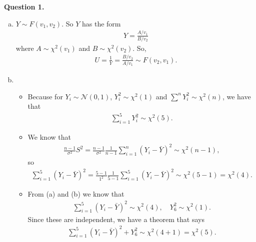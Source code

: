 \documentclass[11pt]{article}
\begin{document}
\noindent \textbf{Question 1.}
\begin{enumerate}[(a)]
	\item $Y \sim F(v_1,v_2)$. So $Y$ has the form
	\begin{align*}
	Y = \frac{A/v_1}{B/v_2}
	\end{align*}
	where $A \sim \chi^2(v_1)$ and $B \sim \chi^2(v_2)$. So, 
	\begin{align*}
	U = \frac{1}{Y} = \frac{B/v_2}{A/v_1} \sim F(v_2,v_1).
	\end{align*}
	
	
	\item 
	\begin{itemize}
		\item Because for $Y_i \sim \mathcal{N}(0,1)$, $Y_i^2\sim \chi^2(1)$ and $\sum^n Y_i^2 \sim \chi^2(n)$, we have that
		\begin{align*}
		\sum^5_{i=1}Y_i^2 \sim \chi^2(5).
		\end{align*}
		
		\item We know that 
		\begin{align*}
		\frac{n-1}{\sigma^2}S^2 = \frac{n-1}{\sigma^2}\frac{1}{n-1}\sum^n_{i=1}(Y_i-\bar{Y})^2 \sim \chi^2(n-1),
		\end{align*}
		so
		\begin{align*}
		\sum^5_{i=1}(Y_i-\bar{Y})^2 = \frac{5-1}{1^2}\frac{1}{5-1}\sum^5_{i=1}(Y_i - \bar{Y})^2 \sim \chi^2(5-1) = \chi^2(4).
		\end{align*}
		
		\item From (a) and (b) we know that 
		\begin{align*}
		\sum^5_{i=1}(Y_i-\bar{Y})^2 \sim \chi^2(4), \quad Y_6^2 \sim \chi^2(1).
		\end{align*}
		Since these are independent, we have a theorem that says
		\begin{align*}
		\sum^5_{i=1}(Y_i-\bar{Y})^2 + Y_6^2 \sim \chi^2(4+1) = \chi^2(5).
		\end{align*}
	\end{itemize}
\end{enumerate}


\newpage
\end{document}
